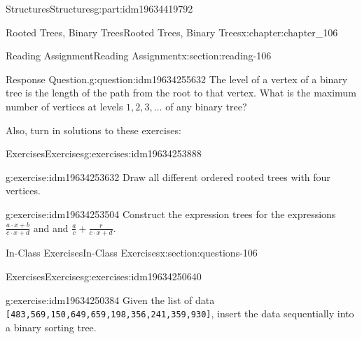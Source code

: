 \documentclass[oneside,10pt,]{book}
\newcommand{\mono}[1]{\texttt{#1}}
\numberwithin{equation}{section}
\begin{document}
\begin{partptx}{Structures}{}{Structures}{}{}{g:part:idm19634419792}
\begin{chapterptx}{Rooted Trees, Binary Trees}{}{Rooted Trees, Binary Trees}{}{}{x:chapter:chapter_106}
\begin{sectionptx}{Reading Assignment}{}{Reading Assignment}{}{}{x:section:reading-106}
\begin{question}{Response Question.}{g:question:idm19634255632}%
The level of a vertex of a binary tree is the length of the path from the root to that vertex.  What is the maximum number of vertices at levels \(1, 2, 3, \dots\) of any binary tree?%
\end{question}
Also, turn in solutions to these exercises:%
%
%
\typeout{************************************************}
\typeout{************************************************}
%
\begin{exercises-subsection-numberless}{Exercises}{}{Exercises}{}{}{g:exercises:idm19634253888}
\par\medskip\noindent%
%
\begin{exercisegroup}
\begin{divisionexerciseeg}{1}{}{}{g:exercise:idm19634253632}%
Draw all different ordered rooted trees with four vertices.%
\end{divisionexerciseeg}%
\begin{divisionexerciseeg}{2}{}{}{g:exercise:idm19634253504}%
Construct the expression trees for the expressions \(\frac{a\cdot x + b}{c\cdot x + d}\) and and \(\frac{a}{c}+\frac{r}{c\cdot x + d}\).%
\end{divisionexerciseeg}%
\end{exercisegroup}
\par\medskip\noindent
\end{exercises-subsection-numberless}
\end{sectionptx}
%
%
\typeout{************************************************}
\typeout{************************************************}
%
\begin{sectionptx}{In-Class Exercises}{}{In-Class Exercises}{}{}{x:section:questions-106}
%
%
%
\typeout{************************************************}
\typeout{************************************************}
%
\begin{exercises-subsection-numberless}{Exercises}{}{Exercises}{}{}{g:exercises:idm19634250640}
\par\medskip\noindent%
%
\begin{exercisegroup}
\begin{divisionexerciseeg}{1}{}{}{g:exercise:idm19634250384}%
Given the list of data \mono{[483,569,150,649,659,198,356,241,359,930]}, insert the data sequentially into a binary sorting tree.%
\end{divisionexerciseeg}%

\end{exercisegroup}
\end{exercises-subsection-numberless}
\end{sectionptx}
\end{chapterptx}
\end{partptx}
\end{document}
